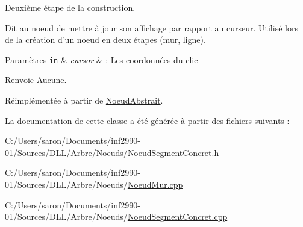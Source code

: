 Deuxième étape de la construction. 

Dit au noeud de mettre à jour son affichage par rapport au curseur. Utilisé lors de la création d'un noeud en deux étapes (mur, ligne).


\begin{DoxyParams}[1]{Paramètres}
\mbox{\tt in}  & {\em cursor} & \-: Les coordonnées du clic\\
\hline
\end{DoxyParams}
\begin{DoxyReturn}{Renvoie}
Aucune. 
\end{DoxyReturn}


Réimplémentée à partir de \hyperlink{group__inf2990_ga233fd4600812176c557bb94ea04da5c9}{Noeud\-Abstrait}.



La documentation de cette classe a été générée à partir des fichiers suivants \-:\begin{DoxyCompactItemize}
\item 
C\-:/\-Users/saron/\-Documents/inf2990-\/01/\-Sources/\-D\-L\-L/\-Arbre/\-Noeuds/\hyperlink{_noeud_segment_concret_8h}{Noeud\-Segment\-Concret.\-h}\item 
C\-:/\-Users/saron/\-Documents/inf2990-\/01/\-Sources/\-D\-L\-L/\-Arbre/\-Noeuds/\hyperlink{_noeud_mur_8cpp}{Noeud\-Mur.\-cpp}\item 
C\-:/\-Users/saron/\-Documents/inf2990-\/01/\-Sources/\-D\-L\-L/\-Arbre/\-Noeuds/\hyperlink{_noeud_segment_concret_8cpp}{Noeud\-Segment\-Concret.\-cpp}\end{DoxyCompactItemize}
